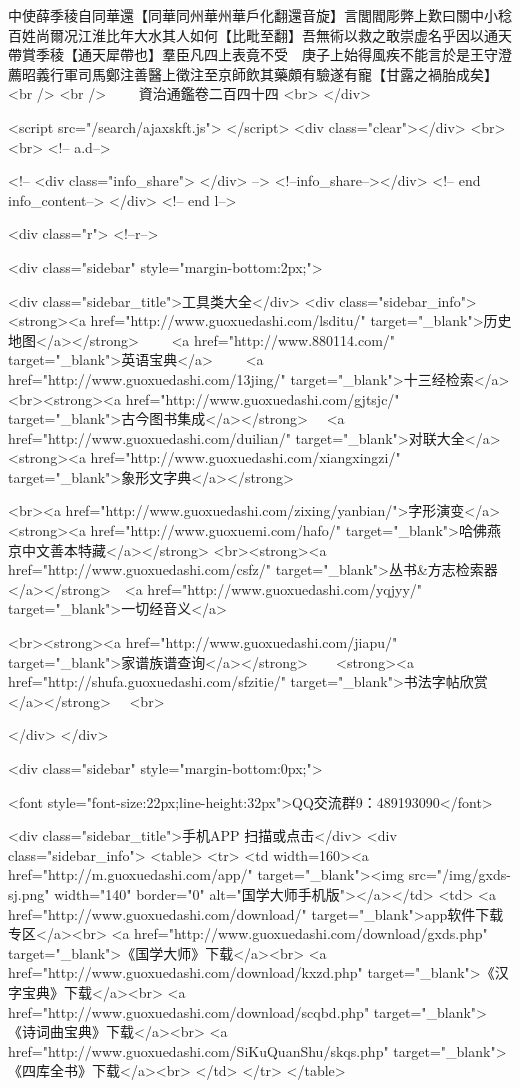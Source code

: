 中使薛季稜自同華還【同華同州華州華戶化翻還音旋】言閭閻彫弊上歎曰關中小稔百姓尚爾况江淮比年大水其人如何【比毗至翻】吾無術以救之敢崇虚名乎因以通天帶賞季稜【通天犀帶也】羣臣凡四上表竟不受　庚子上始得風疾不能言於是王守澄薦昭義行軍司馬鄭注善醫上徵注至京師飲其藥頗有驗遂有寵【甘露之禍胎成矣】<br />
<br />
　　資治通鑑卷二百四十四  <br>
   </div> 

<script src="/search/ajaxskft.js"> </script>
 <div class="clear"></div>
<br>
<br>
 <!-- a.d-->

 <!--
<div class="info_share">
</div> 
-->
 <!--info_share--></div>   <!-- end info_content-->
  </div> <!-- end l-->

<div class="r">   <!--r-->



<div class="sidebar"  style="margin-bottom:2px;">

 
<div class="sidebar_title">工具类大全</div>
<div class="sidebar_info">
<strong><a href="http://www.guoxuedashi.com/lsditu/" target="_blank">历史地图</a></strong>　　
<a href="http://www.880114.com/" target="_blank">英语宝典</a>　　
<a href="http://www.guoxuedashi.com/13jing/" target="_blank">十三经检索</a>　
<br><strong><a href="http://www.guoxuedashi.com/gjtsjc/" target="_blank">古今图书集成</a></strong>　
<a href="http://www.guoxuedashi.com/duilian/" target="_blank">对联大全</a>　<strong><a href="http://www.guoxuedashi.com/xiangxingzi/" target="_blank">象形文字典</a></strong>　

<br><a href="http://www.guoxuedashi.com/zixing/yanbian/">字形演变</a>　　<strong><a href="http://www.guoxuemi.com/hafo/" target="_blank">哈佛燕京中文善本特藏</a></strong>
<br><strong><a href="http://www.guoxuedashi.com/csfz/" target="_blank">丛书&方志检索器</a></strong>　<a href="http://www.guoxuedashi.com/yqjyy/" target="_blank">一切经音义</a>　　

<br><strong><a href="http://www.guoxuedashi.com/jiapu/" target="_blank">家谱族谱查询</a></strong>　　<strong><a href="http://shufa.guoxuedashi.com/sfzitie/" target="_blank">书法字帖欣赏</a></strong>　
<br>

</div>
</div>


<div class="sidebar" style="margin-bottom:0px;">

<font style="font-size:22px;line-height:32px">QQ交流群9：489193090</font>


<div class="sidebar_title">手机APP 扫描或点击</div>
<div class="sidebar_info">
<table>
<tr>
	<td width=160><a href="http://m.guoxuedashi.com/app/" target="_blank"><img src="/img/gxds-sj.png" width="140"  border="0" alt="国学大师手机版"></a></td>
	<td>
<a href="http://www.guoxuedashi.com/download/" target="_blank">app软件下载专区</a><br>
<a href="http://www.guoxuedashi.com/download/gxds.php" target="_blank">《国学大师》下载</a><br>
<a href="http://www.guoxuedashi.com/download/kxzd.php" target="_blank">《汉字宝典》下载</a><br>
<a href="http://www.guoxuedashi.com/download/scqbd.php" target="_blank">《诗词曲宝典》下载</a><br>
<a href="http://www.guoxuedashi.com/SiKuQuanShu/skqs.php" target="_blank">《四库全书》下载</a><br>
</td>
</tr>
</table>

